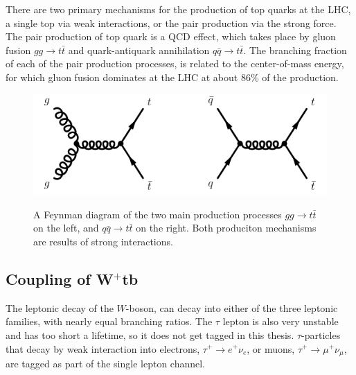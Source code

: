 \documentclass[12pt,a4paper]{article}
\numberwithin{equation}{section}
\begin{document}
There are two primary mechanisms for the production of top quarks at the LHC, a
single top via weak interactions, or the pair production via the strong force.
The pair production of top quark is a QCD effect, which takes place by gluon
fusion $gg \rightarrow t\bar t$ and quark-antiquark annihilation $q\bar q \rightarrow t\bar t$. The
branching fraction of each of the pair production processes, is related to the
center-of-mass energy, for which gluon fusion dominates at the LHC at about 86\%
of the production\cite{dasilva2016quark}.
\begin{figure}[H]
  \centering
	\includegraphics[width=\linewidth]{figures/placeholder_feynman_ttproduction.png}\\
	\caption{A Feynman diagram of the two main production processes $gg \rightarrow t\bar t$
    on the left, and $q\bar q \rightarrow t\bar t$ on the right. Both produciton
    mechanisms are results of strong interactions.}\label{fig:ttproduction}
\end{figure}

\subsection{Coupling of W$^+$tb}\label{sec:coupling}
The leptonic decay of the $W$-boson, can decay into either of the three leptonic
families, with nearly equal branching ratios. The $\tau$ lepton is also very
unstable and has too short a lifetime, so it does not get tagged in this thesis.
$\tau$-particles that decay by weak interaction into electrons, $\tau^+ \rightarrow e^+ \nu_e$, or
muons, $\tau^+ \rightarrow \mu^+ \nu_\mu$, are tagged as part of the single lepton channel.\\
\end{document}
